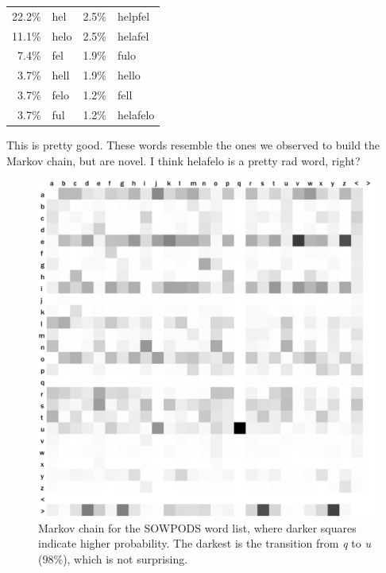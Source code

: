 \documentclass[twocolumn]{article}
\begin{document}
\begin{center}
\begin{tabular}{rl@{\quad\quad}rl}
22.2\%  &  hel      &      2.5\%  &  helpfel  \\
11.1\%  &  helo     &      2.5\%  &  helafel  \\
 7.4\%  &  fel      &      1.9\%  &  fulo     \\
 3.7\%  &  hell     &      1.9\%  &  hello    \\
 3.7\%  &  felo     &      1.2\%  &  fell     \\
 3.7\%  &  ful      &      1.2\%  &  helafelo \\
\end{tabular}
\end{center}

This is pretty good. These words resemble the ones we observed to build
the Markov chain, but are novel. I think helafelo is a pretty rad word,
right?

\begin{figure}[t]
\includegraphics[width=\linewidth]{coin1}
\caption{Markov chain for the SOWPODS word list, where darker squares
indicate higher probability. The darkest is the transition from {\it q}
to {\it u} ($98\%$), which is not surprising.}
\label{fig:sowpodsbigrams}
\end{figure}
\end{document}
